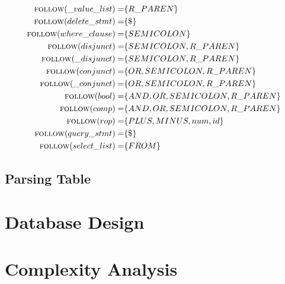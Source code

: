 \documentclass{article}
\begin{document}
\begin{align*}
\textsc{follow}(\_value\_list) =& \{R\_PAREN\} \\
\textsc{follow}(delete\_stmt) =& \{\$\} \\
\textsc{follow}(where\_clause) =& \{SEMICOLON\} \\
\textsc{follow}(disjunct) =& \{SEMICOLON, R\_PAREN\} \\
\textsc{follow}(\_disjunct) =& \{SEMICOLON, R\_PAREN\} \\
\textsc{follow}(conjunct) =& \{OR, SEMICOLON, R\_PAREN\} \\
\textsc{follow}(\_conjunct) =& \{OR, SEMICOLON, R\_PAREN\} \\
\textsc{follow}(bool) =& \{AND, OR, SEMICOLON, R\_PAREN\} \\
\textsc{follow}(comp) =& \{AND, OR, SEMICOLON, R\_PAREN\} \\
\textsc{follow}(rop) =& \{PLUS, MINUS, num, id\} \\
\textsc{follow}(query\_stmt) =& \{\$\} \\
\textsc{follow}(select\_list) =& \{FROM\} 
\end{align*}
\subsection{Parsing Table}

\section{Database Design}

\section{Complexity Analysis}
\end{document}
